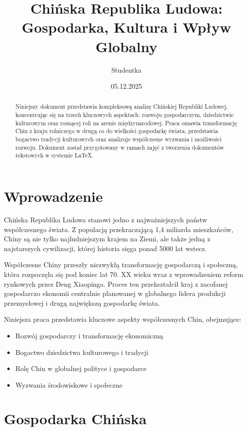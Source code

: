 \documentclass[12pt,a4paper]{report}
\title{\textbf{Chińska Republika Ludowa:\\Gospodarka, Kultura i Wpływ Globalny}}
\author{Studentka}
\date{05.12.2025}
\begin{document}
\maketitle

\begin{abstract}
Niniejszy dokument przedstawia kompleksową analizę Chińskiej Republiki Ludowej, koncentrując się na trzech kluczowych aspektach: rozwoju gospodarczym, dziedzictwie kulturowym oraz rosnącej roli na arenie międzynarodowej. Praca omawia transformację Chin z kraju rolniczego w drugą co do wielkości gospodarkę świata, przedstawia bogactwo tradycji kulturowych oraz analizuje współczesne wyzwania i możliwości rozwoju. Dokument został przygotowany w ramach zajęć z tworzenia dokumentów tekstowych w systemie LaTeX.
\end{abstract}

\tableofcontents

\chapter{Wprowadzenie}

Chińska Republika Ludowa stanowi jedno z najważniejszych państw współczesnego świata. Z populacją przekraczającą 1,4 miliarda mieszkańców, Chiny są nie tylko najludniejszym krajem na Ziemi, ale także jedną z najstarszych cywilizacji, której historia sięga ponad 5000 lat wstecz.

Współczesne Chiny przeszły niezwykłą transformację gospodarczą i społeczną, która rozpoczęła się pod koniec lat 70. XX wieku wraz z wprowadzeniem reform rynkowych przez Deng Xiaopinga. Proces ten przekształcił kraj z zacofanej gospodarczo ekonomii centralnie planowanej w globalnego lidera produkcji przemysłowej i drugą największą gospodarkę świata.

Niniejsza praca przedstawia kluczowe aspekty współczesnych Chin, obejmujące:
\begin{itemize}
\item Rozwój gospodarczy i transformację ekonomiczną
\item Bogactwo dziedzictwa kulturowego i tradycji
\item Rolę Chin w globalnej polityce i gospodarce
\item Wyzwania środowiskowe i społeczne
\end{itemize}

\chapter{Gospodarka Chińska}
\end{document}
